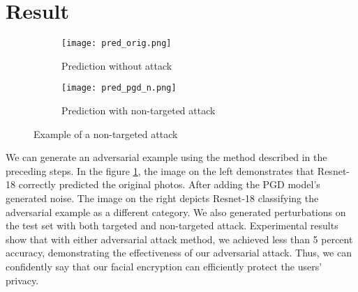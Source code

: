 \section{Result}

\begin{figure}[htbp]
    \centering
    \begin{subfigure}{0.4\textwidth}
        \centering
        \texttt{[image: pred\_orig.png]}
        \caption{Prediction without attack}
    \end{subfigure}
    \qquad
    \begin{subfigure}{0.4\textwidth}
        \centering
        \texttt{[image: pred\_pgd\_n.png]}
        \caption{Prediction with non-targeted attack}
    \end{subfigure}
    \caption{Example of a non-targeted attack}
    \label{fig:pdf_attack_example}
\end{figure}

We can generate an adversarial example using the method described in the preceding steps. In the figure \ref{fig:pdf_attack_example}, the image on the left demonstrates that Resnet-18 correctly predicted the original photos. After adding the PGD model's generated noise. The image on the right depicts Resnet-18 classifying the adversarial example as a different category. We also generated perturbations on the test set with both targeted and non-targeted attack. Experimental results show that with either adversarial attack method, we achieved less than 5 percent accuracy, demonstrating the effectiveness of our adversarial attack. Thus, we can confidently say that our facial encryption can efficiently protect the users' privacy.  


